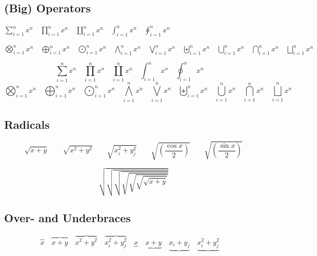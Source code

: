 \documentclass[11pt, a4paper, oneside]{article}
\theoremstyle{Plain}
\theoremstyle{Definition}
\theoremstyle{Remark}
\begin{document}
\begin{appendix}
	\subsection{(Big) Operators \showfamily}

	\def\testop#1{#1_{i=1}^{n} x^{n} \quad}
	$
		\testop\sum
		\testop\prod
		\testop\coprod
		\testop\int
		\testop\oint
	$

	\noindent%
	$
		\testop\bigotimes
		\testop\bigoplus
		\testop\bigodot
		\testop\bigwedge
		\testop\bigvee
		\testop\biguplus
		\testop\bigcup
		\testop\bigcap
		\testop\bigsqcup
	$

	\begin{displaymath}
	  \testop\sum
	  \testop\prod
	  \testop\coprod
	  \testop\int
	  \testop\oint
	\end{displaymath}
	\begin{displaymath}
	  \testop\bigotimes
	  \testop\bigoplus
	  \testop\bigodot
	  \testop\bigwedge
	  \testop\bigvee
	  \testop\biguplus
	  \testop\bigcup
	  \testop\bigcap
	  \testop\bigsqcup
	\end{displaymath}

	\subsection{Radicals \showfamily}

	\begin{displaymath}
	  \sqrt{x+y} \qquad \sqrt{x^{2}+y^{2}} \qquad
	  \sqrt{x_{i}^{2}+y_{j}^{2}} \qquad
	  \sqrt{\left(\frac{\cos x}{2}\right)} \qquad
	  \sqrt{\left(\frac{\sin x}{2}\right)}
	\end{displaymath}

	\begingroup
	\delimitershortfall-1pt
	\begin{displaymath}
	  \sqrt{\sqrt{\sqrt{\sqrt{\sqrt{\sqrt{\sqrt{x+y}}}}}}}
	\end{displaymath}
	\endgroup %

	\subsection{Over- and Underbraces \showfamily}

	\begin{displaymath}
	  \overbrace{x} \quad
	  \overbrace{x+y} \quad
	  \overbrace{x^{2}+y^{2}} \quad
	  \overbrace{x_{i}^{2}+y_{j}^{2}} \quad
	  \underbrace{x} \quad
	  \underbrace{x+y} \quad
	  \underbrace{x_{i}+y_{j}} \quad
	  \underbrace{x_{i}^{2}+y_{j}^{2}} \quad
	\end{displaymath}


\end{appendix}
\end{document}
